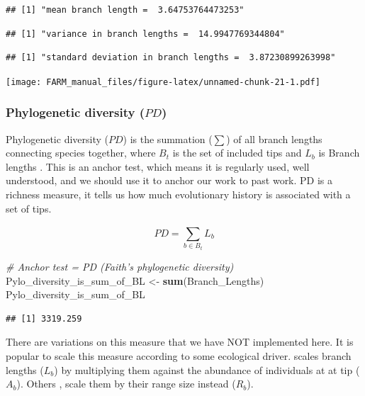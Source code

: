 \documentclass[]{book}
\newenvironment{Shaded}{\begin{snugshade}}{\end{snugshade}}
\newcommand{\KeywordTok}[1]{\textcolor[rgb]{0.13,0.29,0.53}{\textbf{{#1}}}}
\newcommand{\StringTok}[1]{\textcolor[rgb]{0.31,0.60,0.02}{{#1}}}
\newcommand{\CommentTok}[1]{\textcolor[rgb]{0.56,0.35,0.01}{\textit{{#1}}}}
\newcommand{\NormalTok}[1]{{#1}}
\theoremstyle{definition}
\theoremstyle{definition}
\theoremstyle{remark}
\begin{document}
\begin{verbatim}
## [1] "mean branch length =  3.64753764473253"
\end{verbatim}

\begin{verbatim}
## [1] "variance in branch lengths =  14.9947769344804"
\end{verbatim}

\begin{verbatim}
## [1] "standard deviation in branch lengths =  3.87230899263998"
\end{verbatim}

\texttt{[image: FARM\_manual\_files/figure-latex/unnamed-chunk-21-1.pdf]}

\subsubsection{\texorpdfstring{Phylogenetic diversity
(\(PD\))}{Phylogenetic diversity (PD)}}\label{phylogenetic-diversity-pd}

Phylogenetic diversity (\(PD\)) is the summation (\(\sum\)) of all
branch lengths connecting species together, where \(B_{t}\) is the set
of included tips and \(L_{b}\) is Branch lengths \citep{Faith1992}. This
is an anchor test, which means it is regularly used, well understood,
and we should use it to anchor our work to past work. PD is a richness
measure, it tells us how much evolutionary history is associated with a
set of tips.

\[PD = \sum_{b \in B_{t}}^{}L_{b}\]

\begin{Shaded}
\begin{Highlighting}[]
\CommentTok{# Anchor test = PD (Faith's phylogenetic diversity)}
\NormalTok{Pylo_diversity_is_sum_of_BL <-}\StringTok{ }\KeywordTok{sum}\NormalTok{(Branch_Lengths)}
\NormalTok{Pylo_diversity_is_sum_of_BL}
\end{Highlighting}
\end{Shaded}

\begin{verbatim}
## [1] 3319.259
\end{verbatim}

There are variations on this measure that we have NOT implemented here.
It is popular to scale this measure according to some ecological driver.
\citet{Barker2002} scales branch lengths (\(L_{b}\)) by multiplying them
against the abundance of individuals at at tip (\(A_{b}\)). Others
\citep{Rosauer2009}, scale them by their range size instead (\(R_{b}\)).
\end{document}
